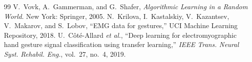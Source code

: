 \documentclass[conference]{IEEEtran}
\begin{document}
\begin{thebibliography}{99}
 V.~Vovk, A.~Gammerman, and G.~Shafer, \emph{Algorithmic Learning in a Random World}. New York: Springer, 2005.
 N.~Krilova, I.~Kastalskiy, V.~Kazantsev, V.~Makarov, and S.~Lobov, ``EMG data for gestures,'' UCI Machine Learning Repository, 2018.
 U.~C\^ot\'e-Allard \emph{et al.}, ``Deep learning for electromyographic hand gesture signal classification using transfer learning,'' \emph{IEEE Trans. Neural Syst. Rehabil. Eng.}, vol.~27, no.~4, 2019.
\end{thebibliography}
\end{document}
